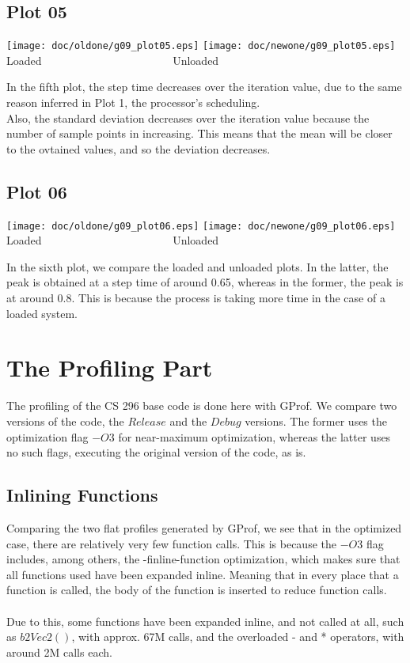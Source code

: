 \documentclass[a4paper,11pt]{article}
\begin{document}
\subsection*{Plot 05}

\begin{center}
  \texttt{[image: doc/oldone/g09\_plot05.eps]}
  \texttt{[image: doc/newone/g09\_plot05.eps]}
\\  Loaded~~~~~~~~~~~~~~~~~~~~~~~ Unloaded  
\end{center}

In the fifth plot, the step time decreases over the iteration value, due to the same reason inferred in Plot 1, the processor's scheduling.\\
Also, the standard deviation decreases over the iteration value because the number of sample points in increasing. This means that the mean will be closer to the ovtained values, and so the deviation decreases.

\subsection*{Plot 06}

\begin{center}
  \texttt{[image: doc/oldone/g09\_plot06.eps]}
  \texttt{[image: doc/newone/g09\_plot06.eps]}
\\  Loaded~~~~~~~~~~~~~~~~~~~~~~~ Unloaded  
\end{center}

In the sixth plot, we compare the loaded and unloaded plots. In the latter, the peak is obtained at a step time of around 0.65, whereas in the former, the peak is at around 0.8. This is because the process is taking more time in the case of a loaded system.

\section{The Profiling Part}
The profiling of the CS 296 base code is done here with GProf. We compare two versions of the code, the $Release$ and the $Debug$ versions. The former uses the optimization flag $-O3$ for near-maximum optimization, whereas the latter uses no such flags, executing the original version of the code, as is.

\subsection*{Inlining Functions}
Comparing the two flat profiles generated by GProf, we see that in the optimized case, there are relatively very few function calls. This is because the $-O3$ flag includes, among others, the -finline-function optimization, which makes sure that all functions used have been expanded inline. Meaning that in every place that a function is called, the body of the function is inserted to reduce function calls.\\\\
Due to this, some functions have been expanded inline, and not called at all, such as $b2Vec2()$, with approx. 67M calls, and the overloaded - and * operators, with around 2M calls each.
\end{document}
